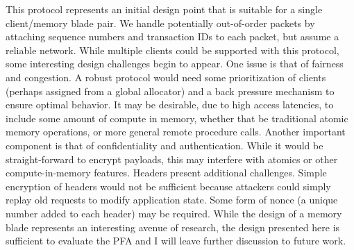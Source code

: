 This protocol represents an initial design point that is suitable for a single
client/memory blade pair. We handle potentially out-of-order packets by
attaching sequence numbers and transaction IDs to each packet, but assume a
reliable network. While multiple clients could be supported with this protocol,
some interesting design challenges begin to appear. One issue is that of
fairness and congestion. A robust protocol would need some prioritization of
clients (perhaps assigned from a global allocator) and a back pressure mechanism
to ensure optimal behavior. It may be desirable, due to high access latencies,
to include some amount of compute in memory, whether that be traditional atomic
memory operations, or more general remote procedure calls. Another important component is that of
confidentiality and authentication. While it would be straight-forward to
encrypt payloads, this may interfere with atomics or other compute-in-memory
features. Headers present additional challenges. Simple encryption of headers
would not be sufficient because attackers could simply replay old requests to
modify application state. Some form of nonce (a unique number added to each
header) may be required. While the design of a memory blade represents an
interesting avenue of research, the design presented here is sufficient to
evaluate the PFA and I will leave further discussion to future work.

